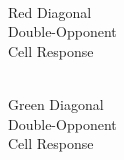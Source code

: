 \documentclass[journal,onecolumn]{IEEEtran}
\begin{document}
\begin{figure}[H]
\begin{subfigure}{0.15\textwidth}
        \caption{\\ Red Diagonal\\ Double-Opponent\\ Cell Response}
    \end{subfigure}
    \begin{subfigure}{0.15\textwidth}
        \centering
        \captionsetup{justification=centering}
        \caption{\\ Green Diagonal\\ Double-Opponent\\ Cell Response}
    \end{subfigure}
    \begin{subfigure}{0.15\textwidth}
        \centering
        \captionsetup{justification=centering}

\end{subfigure}
\end{figure}
\end{document}
